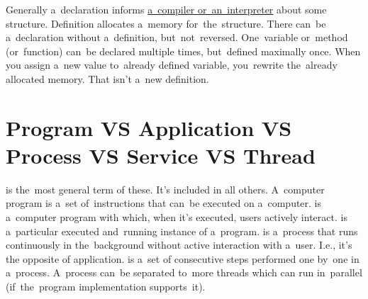 \noindent Generally a~declaration informs \hyperref[compiledinterpretedlanguages]{a~compiler or~an~interpreter} about some structure.
Definition allocates a~memory for~the~structure.
There can~be a~declaration without a~definition, but~not~reversed.
One~variable or~method (or~function) can~be declared multiple times, but~defined maximally once.
When you assign a~new value to~already defined variable, you~rewrite the~already allocated memory.
That isn't a~new definition.

\section*{\fontsize{17}{17} \selectfont Program VS Application VS Process VS Service VS Thread}
\label{applicationprocessprogramservicethread}
\begin{itemize}
     is the~most general term of these.
            It's included in all others.
            A~computer program is a~set of~instructions that can~be executed on a~computer.
     is a~computer program with which, when it's executed, users actively interact.
     is a~particular executed and~running instance of a~program.
     is a~process that runs continuously in the~background without active interaction with a~user.
            I.e., it's the opposite of application.
     is a~set of consecutive steps performed one by~one in a~process.
            A~process can~be separated to~more threads which can run in~parallel (if~the~program implementation supports~it).
\end{itemize}
\newpage

